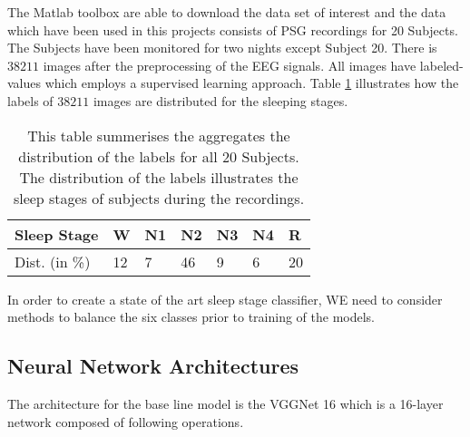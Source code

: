 The Matlab toolbox are able to download the data set of interest and the data which have been used in this projects consists of PSG recordings for 20 Subjects. The Subjects have been monitored for two nights except Subject 20. There is $38211$ images after the preprocessing of the EEG signals. All images have labeled-values which employs a supervised learning approach. Table \ref{tab_class_balance} illustrates how the labels of $38211$ images are distributed for the sleeping stages.

\begin{table}[th!]
\begin{tabular}{l|llllll}
Sleep Stage & W & N1 &  N2& N3 & N4 & R \\\hline
Dist. (in \%) &12 &7&46&9&6&20
\end{tabular}
\caption{This table summerises the aggregates the distribution of the labels for all 20 Subjects. The distribution of the labels illustrates the sleep stages of subjects during the recordings.}
\label{tab_class_balance}
\end{table}

In order to create a state of the art sleep stage classifier, WE need to consider methods to balance the six classes prior to training of the models.



\subsection{Neural Network Architectures}

The architecture for the base line model is the VGGNet 16 \cite{main_ar, VGGnet16} which is a 16-layer network composed of following operations.


